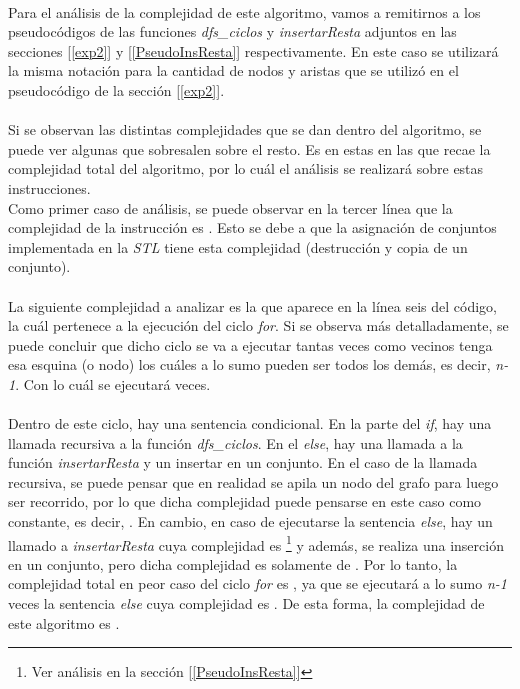 \paragraph{}
Para el análisis de la complejidad de este algoritmo, vamos a remitirnos a los pseudocódigos de las funciones \textit{dfs\_ciclos} y \textit{insertarResta} adjuntos en las secciones [\ref{exp2}] y [\ref{PseudoInsResta}] respectivamente. En este caso se utilizará la misma notación para la cantidad de nodos y aristas que se utilizó en el pseudocódigo de la sección [\ref{exp2}].

\paragraph{}
Si se observan las distintas complejidades que se dan dentro del algoritmo, se puede ver algunas que sobresalen sobre el resto. Es en estas en las que recae la complejidad total del algoritmo, por lo cuál el análisis se realizará sobre estas instrucciones.\\
Como primer caso de análisis, se puede observar en la tercer línea que la complejidad de la instrucción es . Esto se debe a que la asignación de conjuntos implementada en la \textit{STL} tiene esta complejidad (destrucción y copia de un conjunto).

\paragraph{}
La siguiente complejidad a analizar es la que aparece en la línea seis del código, la cuál pertenece a la ejecución del ciclo \textit{for}. Si se observa más detalladamente, se puede concluir que dicho ciclo se va a ejecutar tantas veces como vecinos tenga esa esquina (o nodo) los cuáles a lo sumo pueden ser todos los demás, es decir, \textit{n-1}. Con lo cuál se ejecutará  veces.

\paragraph{}
Dentro de este ciclo, hay una sentencia condicional. En la parte del \textit{if}, hay una llamada recursiva a la función \textit{dfs\_ciclos}. En el \textit{else}, hay una llamada a la función \textit{insertarResta} y un insertar en un conjunto. En el caso de la llamada recursiva, se puede pensar que en realidad se apila un nodo del grafo para luego ser recorrido, por lo que dicha complejidad puede pensarse en este caso como constante, es decir, . En cambio, en caso de ejecutarse la sentencia \textit{else}, hay un llamado a \textit{insertarResta} cuya complejidad es \footnote{Ver análisis en la sección [\ref{PseudoInsResta}]} y además, se realiza una inserción en un conjunto, pero dicha complejidad es solamente de . Por lo tanto, la complejidad total en peor caso del ciclo \textit{for} es , ya que se ejecutará a lo sumo \textit{n-1} veces la sentencia \textit{else} cuya complejidad es . De esta forma, la complejidad de este algoritmo es .


